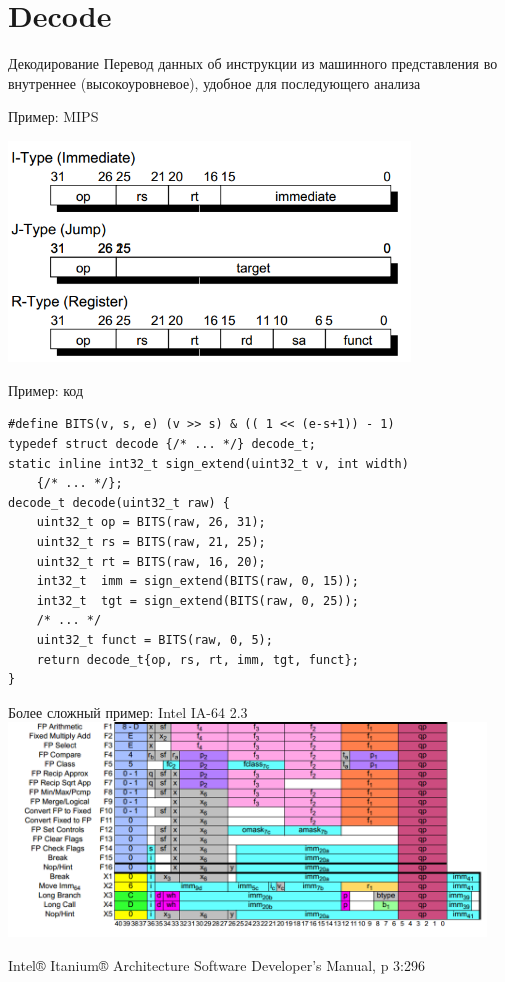 \documentclass{beamer}
\begin{document}
\section{Decode}

\begin{frame}{Декодирование}
Перевод данных об инструкции из машинного представления во внутреннее (высокоуровневое), удобное для последующего анализа
\end{frame}

\begin{frame}{Пример: MIPS}
\centering

\includegraphics[width=0.8\textwidth]{./mips-formats}

\end{frame}

\begin{frame}[fragile]{Пример: код}
\begin{verbatim}
#define BITS(v, s, e) (v >> s) & (( 1 << (e-s+1)) - 1)
typedef struct decode {/* ... */} decode_t;
static inline int32_t sign_extend(uint32_t v, int width) 
    {/* ... */};
decode_t decode(uint32_t raw) {
    uint32_t op = BITS(raw, 26, 31);
    uint32_t rs = BITS(raw, 21, 25);
    uint32_t rt = BITS(raw, 16, 20);
    int32_t  imm = sign_extend(BITS(raw, 0, 15));
    int32_t  tgt = sign_extend(BITS(raw, 0, 25));
    /* ... */
    uint32_t funct = BITS(raw, 0, 5);
    return decode_t{op, rs, rt, imm, tgt, funct};
}
\end{verbatim}
\end{frame}

\begin{frame}{Более сложный пример: Intel IA-64 2.3}
\centering
\includegraphics[width=0.95\textwidth]{./ia64-formats}

\tiny{Intel® Itanium® Architecture Software Developer’s Manual, p 3:296}

\end{frame}
\end{document}
